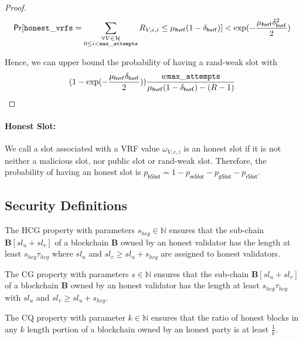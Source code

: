 \begin{proof}
	\begin{equation}\label{eq:beforeepcoh}
	\mathsf{Pr}[ \mathtt{honest\_vrfs} = \sum_{\substack{ \forall V \in \mathcal{H} \\0\leq i < \mathtt{max\_attempts}}} R_{V,e,i} \leq \mu_{\mathsf{hvrf}} (1 - \delta_{\mathsf{hvrf}})] < \exp(-\frac{\mu_{\mathsf{hvrf}}\delta_{\mathsf{hvrf}}^2}{2}) \nonumber
	\end{equation}
	
	Hence, we can upper bound the probability of having a rand-weak slot with
	$$(1 - \exp(-\frac{\mu_{\mathsf{hvrf}}\delta_{\mathsf{hvrf}}}{2}))\frac{w \mathtt{max\_attempts} }{\mu_{\mathsf{hvrf}} (1- \delta_{\mathsf{hvrf}}) - (R  -1)} $$
\end{proof}

\paragraph{Honest Slot:} We call a slot associated with a VRF value $ \omega_{V,e,i} $ is an honest slot  if it is not neither a malicious slot, nor public slot or rand-weak slot. Therefore, the probability of having an honest slot is $ p_{\mathsf{hSlot}} = 1- p_{\mathsf{mSlot}} - p_{\mathsf{pSlot}} - p_{\mathsf{rSlot}}  $.  

\subsection{Security Definitions}


\begin{definition}\label{def:hcg}
	The HCG property with parameters $ s_{hcg} \in \mathbb{N} $ ensures that the sub-chain $  \mathbf{B}[sl_u + sl_v] $ of a blockchain $ \mathbf{B} $ owned by an honest validator has the length at least $ s_{hcg}\tau_{hcg} $ where $ sl_u $ and $ sl_v \geq sl_u + s_{hcg} $ 	are assigned to honest validators.
\end{definition}


\begin{definition} \label{def:cg}
	The CG property with parameters $ s \in \mathbb{N} $ ensures that the sub-chain $  \mathbf{B}[sl_u + sl_v] $ of a blockchain $ \mathbf{B} $ owned by an honest validator has the length at least $ s_{hcg}\tau_{hcg} $ with $ sl_u $ and $ sl_v \geq sl_u + s_{hcg} $.
\end{definition}


\begin{definition}\label{def:cq}
	The CQ property with parameter $ k \in \mathbb{N} $ ensures that the ratio of honest blocks in any $ k $ length portion of a blockchain owned by an honest party is at least $ \frac{1}{k}$.
\end{definition} 




